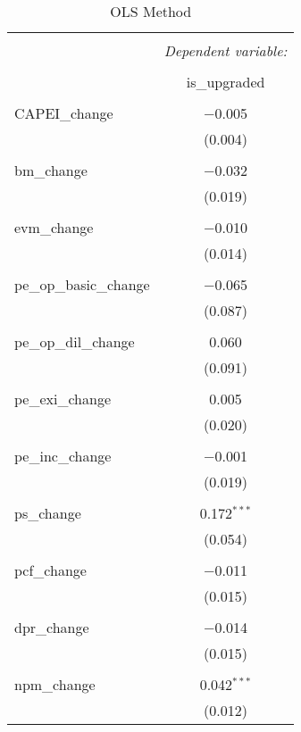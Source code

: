 \documentclass{article}
\begin{document}
\pagestyle{empty}

\begin{table}[!htbp] 
\centering
\footnotesize %
\caption{OLS Method} 
\label{} 
  \begin{tabular}{@{\extracolsep{0pt}}lc} 
  \\[-1.8ex]\hline 
  \hline \\[-1.8ex] 
   & \multicolumn{1}{c}{\textit{Dependent variable:}} \\ 
  \cline{2-2} 
  \\[-1.8ex] & is\_upgraded \\ 
  \hline \\[-1.8ex] 
   CAPEI\_change & $-$0.005 \\ 
    & (0.004) \\ 
    & \\ 
   bm\_change & $-$0.032 \\ 
    & (0.019) \\ 
    & \\ 
   evm\_change & $-$0.010 \\ 
    & (0.014) \\ 
    & \\ 
   pe\_op\_basic\_change & $-$0.065 \\ 
    & (0.087) \\ 
    & \\ 
   pe\_op\_dil\_change & 0.060 \\ 
    & (0.091) \\ 
    & \\ 
   pe\_exi\_change & 0.005 \\ 
    & (0.020) \\ 
    & \\ 
   pe\_inc\_change & $-$0.001 \\ 
    & (0.019) \\ 
    & \\ 
   ps\_change & 0.172$^{***}$ \\ 
    & (0.054) \\ 
    & \\ 
   pcf\_change & $-$0.011 \\ 
    & (0.015) \\ 
    & \\ 
   dpr\_change & $-$0.014 \\ 
    & (0.015) \\ 
    & \\ 
   npm\_change & 0.042$^{***}$ \\ 
    & (0.012) \\ 

\end{tabular}
\end{table}
\end{document}
